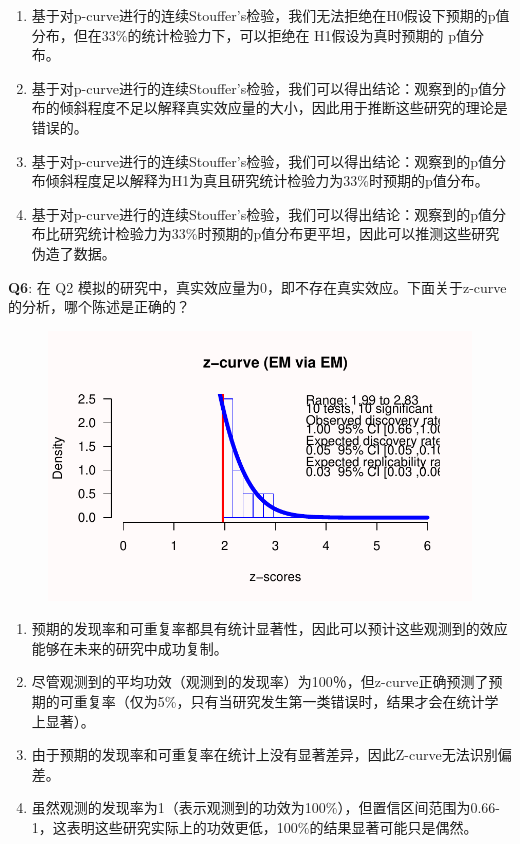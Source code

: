\documentclass[
  letterpaper,
  DIV=11,
  numbers=noendperiod]{scrreprt}
\providecommand{\tightlist}{%
  \setlength{\itemsep}{0pt}\setlength{\parskip}{0pt}}\usepackage{longtable,booktabs,array}
\begin{document}
\begin{enumerate}
\def\labelenumi{\Alph{enumi})}
\tightlist
\item
  基于对p-curve进行的连续Stouffer's检验，我们无法拒绝在H0假设下预期的p值分布，但在33\%的统计检验力下，可以拒绝在
  H1假设为真时预期的 p值分布。
\item
  基于对p-curve进行的连续Stouffer's检验，我们可以得出结论：观察到的p值分布的倾斜程度不足以解释真实效应量的大小，因此用于推断这些研究的理论是错误的。
\item
  基于对p-curve进行的连续Stouffer's检验，我们可以得出结论：观察到的p值分布倾斜程度足以解释为H1为真且研究统计检验力为33\%时预期的p值分布。
\item
  基于对p-curve进行的连续Stouffer's检验，我们可以得出结论：观察到的p值分布比研究统计检验力为33\%时预期的p值分布更平坦，因此可以推测这些研究伪造了数据。
\end{enumerate}

\textbf{Q6}: 在 Q2
模拟的研究中，真实效应量为0，即不存在真实效应。下面关于z-curve的分析，哪个陈述是正确的？

\begin{figure}

{\centering \includegraphics[width=1\textwidth,height=\textheight]{12-bias_files/figure-pdf/zcurveq6-1.pdf}

}

\end{figure}

\begin{enumerate}
\def\labelenumi{\Alph{enumi})}
\tightlist
\item
  预期的发现率和可重复率都具有统计显著性，因此可以预计这些观测到的效应能够在未来的研究中成功复制。
\item
  尽管观测到的平均功效（观测到的发现率）为100％，但z-curve正确预测了预期的可重复率（仅为5\%，只有当研究发生第一类错误时，结果才会在统计学上显著）。
\item
  由于预期的发现率和可重复率在统计上没有显著差异，因此Z-curve无法识别偏差。
\item
  虽然观测的发现率为1（表示观测到的功效为100\%），但置信区间范围为0.66-1，这表明这些研究实际上的功效更低，100\%的结果显著可能只是偶然。
\end{enumerate}
\end{document}
